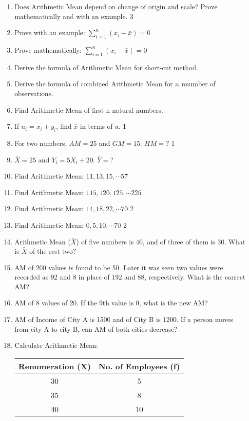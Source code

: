 \documentclass[a4paper,oneside]{book}
\begin{document}
\begin{enumerate}
    \item Does Arithmetic Mean depend on change of origin and 
    scale? Prove mathematically and with an example. \hfill 3
    \item Prove with an example: $\displaystyle \sum_{i=1}^n (x_i-\bar x) = 0$
    \item Prove mathematically: $\displaystyle \sum_{i=1}^n (x_i-\bar x) = 0$
    \item Derive the formula of Arithmetic Mean for short-cut method.
    \item Derive the formula of combined Arithmetic Mean for $n$ nnumber of observations.
    \item Find Arithmetic Mean of first n natural numbers.
    \item If $u_i = x_i + y_i$, find $\bar x$ in terms of $u$. \hfill 1
    \item For two numbers, $AM=25$ and $GM=15$. $HM=?$ \hfill 1
    \item $\bar X = 25$ and $Y_i = 5X_i + 20$. $\bar Y = ?$
    \item Find Arithmetic Mean: $11,13,15, \cdots 57$
    \item Find Arithmetic Mean: $115,120,125, \cdots 225$
    \item Find Arithmetic Mean: $14,18,22, \cdots 70$ \hfill 2
    \item Find Arithmetic Mean: $0, 5, 10, \cdots 70$ \hfill 2
    \item Arithmetic Mean ($\bar X$) of five numbers is 40, and of three of them is 30. What is $\bar X$ of the rest two?
    \item AM of 200 values is found to be 50. Later it was seen two values were recorded as 92 and 8 in place of 192 and 88, respectively. What is the correct AM?
    \item AM of 8 values of 20. If the 9th value is 0, what is the new AM?
    \item AM of Income of City A is 1500 and of City B is 1200. If a person moves from city A to city B, can AM of both cities decrease?
    \item Calculate Arithmetic Mean:
    
    \begin{table}[h]
    \centering
\begin{tabular}{c|c}
\textbf{Renumeration (X)} & \textbf{No. of Employees (f)} \\ \hline
30               & 5                    \\ \hline
35               & 8                    \\ \hline
40               & 10                  
\end{tabular}
\end{table}
    

\end{enumerate}
\end{document}
